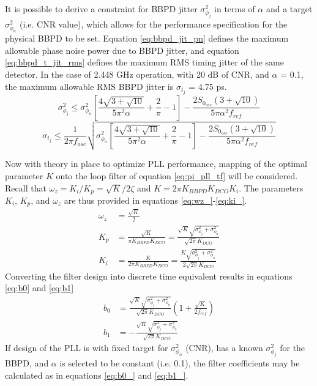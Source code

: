			It is possible to derive a constraint for BBPD jitter $\sigma^2_{\phi_j}$ in terms of $\alpha$ and a target $\sigma^2_{\phi_n}$ (i.e. CNR value), which allows for the performance specification for the physical BBPD to be set. Equation \ref{eq:bbpd_jit_pn} defines the maximum allowable phase noise power due to BBPD jitter, and equation \ref{eq:bbpd_t_jit_rms} defines the maximum RMS timing jitter of the same detector. In the case of 2.448 GHz operation, with 20 dB of CNR, and $\alpha$ = 0.1, the maximum allowable RMS BBPD jitter is $\sigma_{t_j}$ = 4.75 ps.
			\begin{equation}\label{eq:bbpd_jit_pn}
				\sigma^2_{\phi_j} \leq \sigma^2_{\phi_n}\left[\frac{4\sqrt{3+\sqrt{10}}}{5\pi^2\alpha} +\frac{2}{\pi} - 1 \right] - \frac{2S_{0_{osc}}(3 + \sqrt{10})}{5\pi\alpha^2f_{ref}}
			\end{equation}
			\begin{equation}\label{eq:bbpd_t_jit_rms}
				\sigma_{t_j} \leq \frac{1}{2\pi f_{osc}}\sqrt{\sigma^2_{\phi_n}\left[\frac{4\sqrt{3+\sqrt{10}}}{5\pi^2\alpha} +\frac{2}{\pi} - 1 \right] - \frac{2S_{0_{osc}}(3 + \sqrt{10})}{5\pi\alpha^2f_{ref}}}
			\end{equation}

			Now with theory in place to optimize PLL performance, mapping of the optimal parameter $K$ onto the loop filter of equation \ref{eq:pi_pll_tf} will be considered. Recall that $\omega_z = K_i/K_p = \sqrt{K}/2\zeta$ and $K = 2\pi K_{BBPD}K_{DCO}K_{i}$. The parameters $K_i$, $K_p$, and $\omega_z$ are thus provided in equations \ref{eq:wz_}-\ref{eq:ki_}.
			\begin{align}
				\omega_z &= \frac{\sqrt{K}}{2}\label{eq:wz_}\\
				K_p &= \frac{\sqrt{K}}{\pi K_{BBPD}K_{DCO}} = \frac{\sqrt{K}\sqrt{\sigma^2_{\phi_j} + \sigma^2_{\phi_n}}}{\sqrt{2\pi}K_{DCO}}\\
				K_i &= \frac{K}{2\pi K_{BBPD}K_{DCO}} = \frac{K\sqrt{\sigma^2_{\phi_j} + \sigma^2_{\phi_n}}}{2\sqrt{2\pi}K_{DCO}}\label{eq:ki_}
			\end{align}
			Converting the filter design into discrete time equivalent results in equations \ref{eq:b0} and \ref{eq:b1}
			\begin{align}
				b_0 &= \frac{\sqrt{K}\sqrt{\sigma^2_{\phi_j} + \sigma^2_{\phi_n}}}{\sqrt{2\pi}K_{DCO}}\left(1+\frac{\sqrt{K}}{2f_{ref}}\right)\label{eq:b0}\\
				 b_1 &=  - \frac{\sqrt{K}\sqrt{\sigma^2_{\phi_j} + \sigma^2_{\phi_n}}}{\sqrt{2\pi}K_{DCO}}\label{eq:b1}
			\end{align}
			If design of the PLL is with fixed target for $\sigma^2_{\phi_n}$ (CNR), has a known $\sigma^2_{\phi_j}$ for the BBPD, and $\alpha$ is selected to be constant (i.e. 0.1), the filter coefficients may be calculated as in equations \ref{eq:b0_} and \ref{eq:b1_}.

